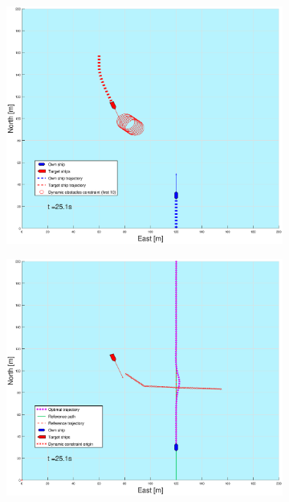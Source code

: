 \begin{figure}[ht!] %
    \begin{subfigure}[b]{0.49\textwidth}
        \centering
        \includegraphics[width=\textwidth]{Images/Figures/sving_SO/_Simple_0fig1_time=25}
    \end{subfigure}
    \hfill
    \begin{subfigure}[b]{0.499\textwidth}
        \centering
        \includegraphics[width=\textwidth]{Images/Figures/sving_SO/_Simple_0fig999_time=25}

\end{subfigure}
\end{figure}
